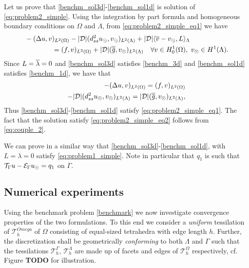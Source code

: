 \documentclass[r]{siamart171218}
\begin{document}
Let us prove that \eqref{benchm_sol3d}-\eqref{benchm_sol1d} is solution of
\eqref{eq:problem2_simple}. Using the integration by part formula and homogeneous
boundary conditions on $\Omega$ and $\Lambda$, from \eqref{eq:problem2_simple_eq1} we have
\begin{align*}
&-(\Delta u, v)_{L^2(\Omega)} - |{\cal D}|(d^2_{ss} \ud, \vd)_{L^2(\Lambda)} 
+ |{\cal D}|\langle \avrc{v}  - \vd, L \rangle_\Lambda
\\
\nonumber
&\qquad\qquad= (f,v)_{L^2(\Omega)} + |{\cal D}| (\avrd{g},\vd)_{L^2(\Lambda)}
\quad \forall v \in H^1_0(\Omega), \ \vd \in H^1(\Lambda).
\\
\end{align*}
Since $L=\overline{\lambda}=0$ and \eqref{benchm_sol3d} satisfies \eqref{benchm_3d} and \eqref{benchm_sol1d}
satisfies \eqref{benchm_1d}, we have that
\begin{align*}
-(\Delta u, v)_{L^2(\Omega)} =  (f,v)_{L^2(\Omega)} \\
-|{\cal D}|(d^2_{ss} \ud, \vd)_{L^2(\Lambda)}  = |{\cal D}| (\avrd{g},\vd)_{L^2(\Lambda)},
\end{align*}
Thus \eqref{benchm_sol3d}-\eqref{benchm_sol1d} satisfy \eqref{eq:problem2_simple_eq1}.
The fact that the solution satisfy \eqref{eq:problem2_simple_eq2} follows from \eqref{eq:couple_2}.

We can prove in a similar way that \eqref{benchm_sol3d}-\eqref{benchm_sol1d}, with $L=\lambda=0$
satisfy \eqref{eq:problem1_simple}. Note in particular that $q_1$ is such that
$\mathcal{T}_{\Gamma}u - \mathcal{E}_{\Gamma}u_{\odot} = q_1$ on $\Gamma$.

\subsection{Numerical experiments} Using the benchmark problem \eqref{benchmark}
we now investigate convergence properties of the two formulations. To this
end we consider a \emph{uniform} tessilation of $\mathcal{T}^{Omega}_h$ of $\Omega$ consisting of
equal-sized tetrahedra with edge length $h$. Further, the discretization shall be
geometrically \emph{conforming} to both $\Lambda$ and $\Gamma$ such that
the tessilations $\mathcal{T}^{\Gamma}_h$, $\mathcal{T}^{\Lambda}_h$ are made up
of facets and edges of $\mathcal{T}^{\Omega}_h$ respectively, cf. Figure \textbf{TODO}
for illustration.
\end{document}
